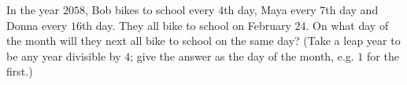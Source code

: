 In the year $2058$, Bob bikes to school every $4$th day, Maya every $7$th day and Donna every $16$th day. They all bike to school on February $24$. On what day of the month will they next all bike to school on the same day? (Take a leap year to be any year divisible by $4$; give the answer as the day of the month, e.g. $1$ for the first.)
